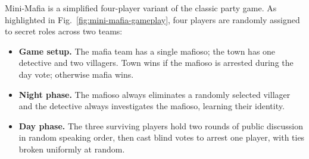 \documentclass{article}
\begin{document}
Mini-Mafia is a simplified four-player variant of the classic party game. As highlighted in Fig.~\ref{fig:mini-mafia-gameplay}, four players are randomly assigned to secret roles across two teams:
\begin{itemize}
    \item \textbf{Game setup.} The mafia team has a single mafioso; the town has one detective and two villagers. Town wins if the mafioso is arrested during the day vote; otherwise mafia wins.

    \item \textbf{Night phase.} The mafioso always eliminates a randomly selected villager and the detective always investigates the mafioso, learning their identity.
    
    \item \textbf{Day phase.} The three surviving players hold two rounds of public discussion in random speaking order, then cast blind votes to arrest one player, with ties broken uniformly at random.
\end{itemize}
\end{document}
